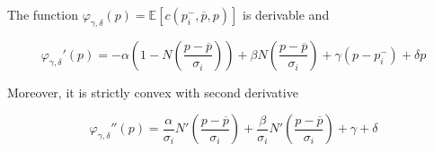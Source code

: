 \documentclass[graybox]{svmult}
\begin{document}
\begin{proposition}
\label{prop:phigammadelta}
The function $\varphi_{\gamma,\delta}(p)=\mathbb{E}[c(p_i^-,\overline p,p)]$ is derivable and

\begin{equation}\label{eq:varphiprimo}
\varphi_{\gamma,\delta}'(p)=-\alpha\left(1-N\left(\frac{p-\overline p}{\sigma_i}\right)\right)+\beta N\left(\frac{p-\overline p}{\sigma_i}\right)+\gamma(p-p_i^-)+\delta p
\end{equation}


\noindent
Moreover, it is strictly convex with second derivative

\begin{equation}
\label{eq:varphisecondo}
\varphi_{\gamma,\delta}''(p)=\frac{\alpha}{\sigma_i}N'\left(\frac{p-\overline p}{\sigma_i}\right)+\frac{\beta}{\sigma_i}N'\left(\frac{p-\overline p}{\sigma_i}\right)+\gamma+\delta
\end{equation}
\end{proposition}
\end{document}
